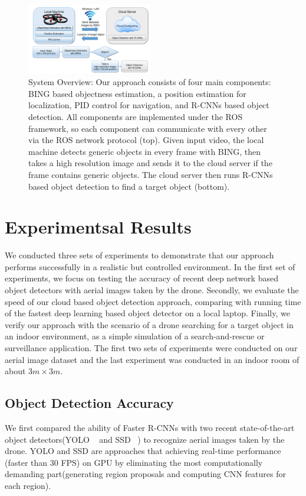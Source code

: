 \begin{figure}[t]
 \centering
    \includegraphics[width=0.489\textwidth]{figures/chapter2/overview.pdf}
 \caption{System Overview: Our approach consists of four main components: BING based objectness estimation, a position estimation for localization, PID control for navigation, and R-CNNs based object detection.
All components are implemented under the ROS framework, so each component can communicate with every other via the ROS network protocol (top). Given input video, the local machine detects generic objects in every frame with BING,
then takes a high resolution image and sends it to the cloud server if the frame contains generic objects. The cloud server then runs R-CNNs based object detection to find a target object (bottom).}
 \label{fig:overview}
\end{figure}

\section{Experimentsal Results}
We conducted three sets of experiments to demonstrate that our approach performs successfully in a realistic but controlled environment. 
In the first set of experiments, we focus on testing the accuracy of recent deep network based object detectors with aerial images taken by the drone.
Secondly, we evaluate the speed of our cloud based object detection approach, comparing with running time of the fastest deep learning based object detector on a local laptop. Finally, we verify our approach with the scenario of a drone searching for a target object in an indoor environment, as a simple simulation of a search-and-rescue or surveillance application. 
The first two sets of experiments were conducted on our aerial image dataset and the last experiment was conducted in an indoor room of about $3m \times 3m$.

\subsection{Object Detection Accuracy}
We first compared the ability of Faster R-CNNs with two recent state-of-the-art object detectors(YOLO ~\cite{yolo}
 and SSD ~\cite{ssd}) to recognize aerial images taken by the drone.
YOLO and SSD are approaches that achieving real-time performance (faster than 30 FPS) on GPU by eliminating the most computationally demanding part(generating region proposals and computing CNN features for each region). 

